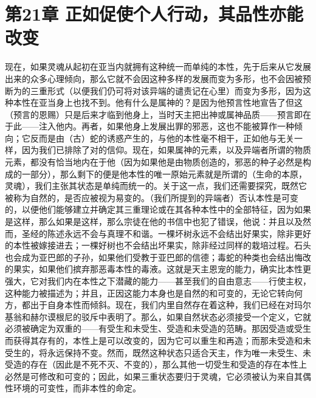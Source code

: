 \section{第21章 正如促使个人行动，其品性亦能改变}

现在，如果灵魂从起初在亚当内就拥有这种统一而单纯的本性，先于后来从它发展出来的众多心理倾向，那么它就不会因这种多样的发展而变为多形，也不会因被预断为的三重形式（以便我们仍可将对该异端的谴责记在心里）而变为多形，因为这种本性在亚当身上也找不到。他有什么是属神的？是因为他预言性地宣告了但这（预言的恩赐）只是后来才临到他身上，当时天主把出神或属神品质——预言即在于此——注入他内。再者，如果他身上发展出罪的邪恶，这也不能被算作一种倾向；它反而是由（古）蛇的诱惑产生的，与他的本性毫不相干，正如他与无关一样，因为我们已排除了对的信仰。现在，如果属神的元素，以及异端者所谓的物质元素，都没有恰当地内在于他（因为如果他是由物质创造的，邪恶的种子必然是构成的一部分），那么剩下的便是他本性的唯一原始元素就是所谓的（生命的本原，灵魂），我们主张其状态是单纯而统一的。关于这一点，我们还需要探究，既然它被称为自然的，是否应被视为易变的。（我们所提到的异端者）否认本性是可变的，以便他们能够建立并确定其三重理论或在其各种本性中的全部特征，因为如果是这样，那么如果是这样，那么宗徒在他的书信中也犯了错误，他说：并且以及然而，圣经的陈述永远不会与真理不和谐。一棵坏树永远不会结出好果实，除非更好的本性被嫁接进去；一棵好树也不会结出坏果实，除非经过同样的栽培过程。石头也会成为亚巴郎的子孙，如果他们受教于亚巴郎的信德；毒蛇的种类也会结出悔改的果实，如果他们摈弃那恶毒本性的毒液。这就是天主恩宠的能力，确实比本性更强大，它对我们内在本性之下潜藏的能力——甚至我们的自由意志——行使主权，这种能力被描述为；并且，正因这能力本身也是自然的和可变的，无论它转向何方，都出于自身本性而倾斜。现在，我们内里自然存在着这种，我们已经在对玛尔基翁和赫尔谟根尼的驳斥中表明了。那么，如果自然状态必须接受一个定义，它就必须被确定为双重的——有受生和未受生、受造和未受造的范畴。那因受造或受生而获得其存有的，本性上是可以改变的，因为它可以重生和再造；而那未受造和未受生的，将永远保持不变。然而，既然这种状态只适合天主，作为唯一未受生、未受造的存在（因此是不死不灭、不变的），那么其他一切受生和受造的存在本性上必然是可修改和可变的；因此，如果三重状态要归于灵魂，它必须被认为来自其偶性环境的可变性，而非本性的命定。\par


